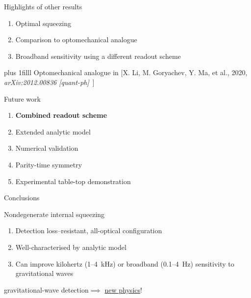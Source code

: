 \documentclass[12pt,xcolor=dvipsnames]{beamer}
\begin{document}
\begin{frame}{Highlights of other results}
\vspace{2cm}
	\begin{enumerate}
	\item Optimal squeezing
	\item Comparison to optomechanical analogue
	\item Broadband sensitivity using a different readout scheme %
	\end{enumerate}
\vskip0pt plus 1filll
\centering
{\tiny\vspace{-0.15cm}Optomechanical analogue in [X. Li, M. Goryachev, Y. Ma, et al., 2020, \emph{arXiv:2012.00836 [quant-ph]}\ ]}
\end{frame}

\begin{frame}{Future work}
	\begin{enumerate}
	\item \textbf{Combined readout scheme} %
	\item Extended analytic model %
	\item Numerical validation %
	\item Parity-time symmetry
	\item Experimental table-top demonstration 
	\end{enumerate}
\end{frame}

\begin{frame}{Conclusions}
\begin{block}{Nondegenerate internal squeezing}
\begin{enumerate}
\item Detection loss--resistant, all-optical configuration
\item Well-characterised by analytic model
\item Can improve kilohertz (1--4~kHz) or broadband (0.1--4~Hz) sensitivity to gravitational waves 
\end{enumerate}
\end{block}
\centering
\vspace{0.5cm}
{\large gravitational-wave detection$\implies$ \underline{new physics}!}
\end{frame}



\end{document}
